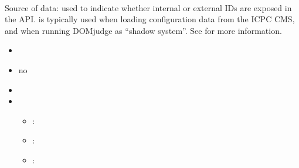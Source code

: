 \documentclass[a4paper,10pt,english,openany]{sphinxmanual}
\begin{document}
\paragraph{}
\label{\detokenize{configuration-reference:data-source}}
\sphinxAtStartPar
Source of data: used to indicate whether internal or external IDs are exposed in the API.  is typically used when loading configuration data from the ICPC CMS, and  when running DOMjudge as “shadow system”. See {\hyperref[\detokenize{shadow::doc}]{}} for more information.
\begin{itemize}
\item {} 
\sphinxAtStartPar
{} 

\item {} 
\sphinxAtStartPar
{} no

\item {} 
\sphinxAtStartPar
{} 

\item {} 
\sphinxAtStartPar
{}
\begin{itemize}
\item {} 
\sphinxAtStartPar
{}: 

\item {} 
\sphinxAtStartPar
{}: 

\item {} 
\sphinxAtStartPar
{}: 

\end{itemize}

\end{itemize}
\end{document}
